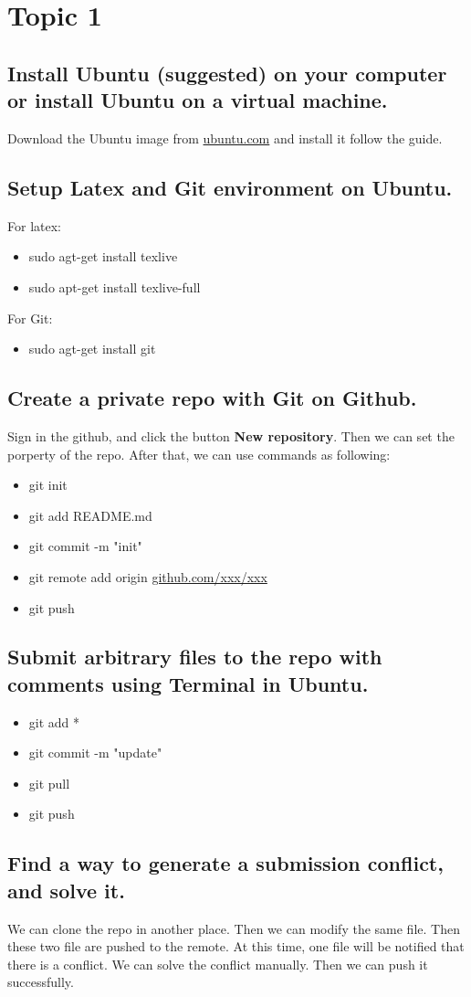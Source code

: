\documentclass{article}
\begin{document}
\section{Topic 1}
\subsection{Install Ubuntu (suggested) on your computer or install Ubuntu on a virtual machine.}
Download the Ubuntu image from \url{ubuntu.com} and install it follow the guide.

\subsection{Setup Latex and Git environment on Ubuntu.}
For latex:
\begin{itemize}
    \item sudo agt-get install texlive
    \item sudo apt-get install texlive-full
\end{itemize}

For Git:
\begin{itemize}
    \item sudo agt-get install git
\end{itemize}

\subsection{Create a private repo with Git on Github.}
Sign in the github, and click the button \textbf{New repository}.
Then we can set the porperty of the repo.
After that, we can use commands as following:
\begin{itemize}
    \item git init
    \item git add README.md
    \item git commit -m "init"
    \item git remote add origin \url{github.com/xxx/xxx}
    \item git push
\end{itemize}

\subsection{Submit arbitrary files to the repo with comments using Terminal in Ubuntu.}
\begin{itemize}
    \item git add *
    \item git commit -m "update"
    \item git pull
    \item git push
\end{itemize}

\subsection{Find a way to generate a submission conflict, and solve it.}
We can clone the repo in another place.
Then we can modify the same file.
Then these two file are pushed to the remote.
At this time, one file will be notified that there is a conflict.
We can solve the conflict manually.
Then we can push it successfully.
\end{document}
